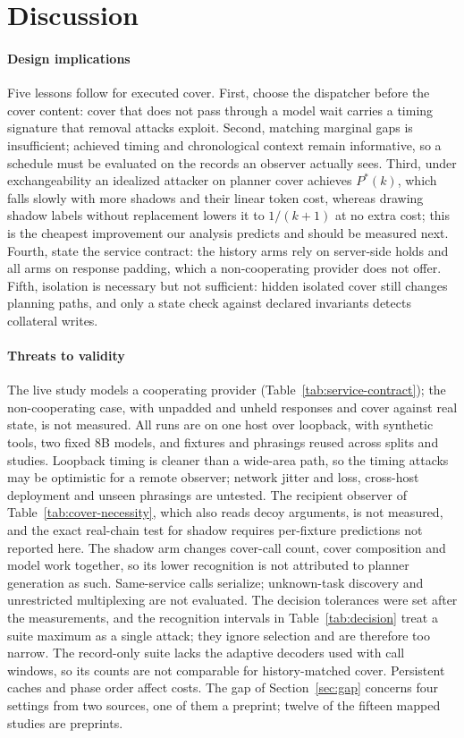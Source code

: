 \section{Discussion}\label{sec:discussion}
\paragraph{Design implications}
Five lessons follow for executed cover. First, choose the dispatcher before the cover content: cover that does not pass through a model wait carries a timing signature that removal attacks exploit. Second, matching marginal gaps is insufficient; achieved timing and chronological context remain informative, so a schedule must be evaluated on the records an observer actually sees. Third, under exchangeability an idealized attacker on planner cover achieves $P^*(k)$, which falls slowly with more shadows and their linear token cost, whereas drawing shadow labels without replacement lowers it to $1/(k+1)$ at no extra cost; this is the cheapest improvement our analysis predicts and should be measured next. Fourth, state the service contract: the history arms rely on server-side holds and all arms on response padding, which a non-cooperating provider does not offer. Fifth, isolation is necessary but not sufficient: hidden isolated cover still changes planning paths, and only a state check against declared invariants detects collateral writes.

\paragraph{Threats to validity}\label{sec:limits}
The live study models a cooperating provider (Table~\ref{tab:service-contract}); the non-cooperating case, with unpadded and unheld responses and cover against real state, is not measured. All runs are on one host over loopback, with synthetic tools, two fixed 8B models, and fixtures and phrasings reused across splits and studies. Loopback timing is cleaner than a wide-area path, so the timing attacks may be optimistic for a remote observer; network jitter and loss, cross-host deployment and unseen phrasings are untested. The recipient observer of Table~\ref{tab:cover-necessity}, which also reads decoy arguments, is not measured, and the exact real-chain test for shadow requires per-fixture predictions not reported here. The shadow arm changes cover-call count, cover composition and model work together, so its lower recognition is not attributed to planner generation as such. Same-service calls serialize; unknown-task discovery and unrestricted multiplexing are not evaluated. The decision tolerances were set after the measurements, and the recognition intervals in Table~\ref{tab:decision} treat a suite maximum as a single attack; they ignore selection and are therefore too narrow. The record-only suite lacks the adaptive decoders used with call windows, so its counts are not comparable for history-matched cover. Persistent caches and phase order affect costs. The gap of Section~\ref{sec:gap} concerns four settings from two sources, one of them a preprint; twelve of the fifteen mapped studies are preprints.

